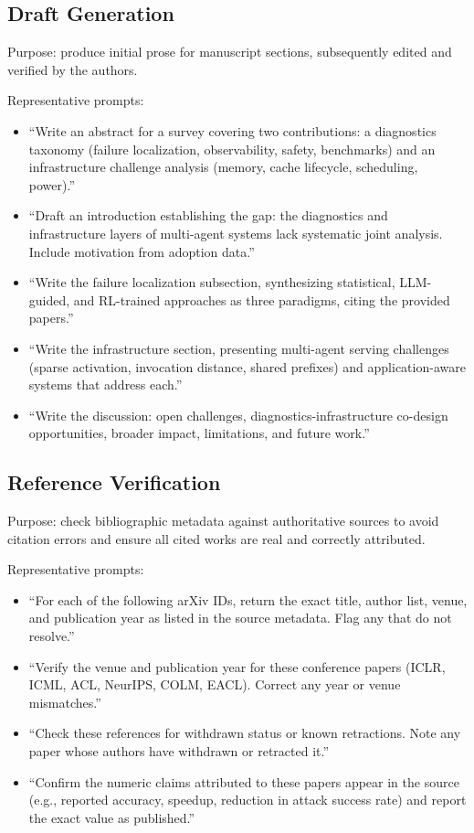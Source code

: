 \documentclass[utf8]{frontiers_suppmat}
\begin{document}
\subsection{Draft Generation}

Purpose: produce initial prose for manuscript sections, subsequently edited and verified by the authors.

Representative prompts:
\begin{itemize}
  \item ``Write an abstract for a survey covering two contributions: a
        diagnostics taxonomy (failure localization, observability, safety,
        benchmarks) and an infrastructure challenge analysis (memory,
        cache lifecycle, scheduling, power).''
  \item ``Draft an introduction establishing the gap: the diagnostics and
        infrastructure layers of multi-agent systems lack systematic joint
        analysis. Include motivation from adoption data.''
  \item ``Write the failure localization subsection, synthesizing
        statistical, LLM-guided, and RL-trained approaches as three
        paradigms, citing the provided papers.''
  \item ``Write the infrastructure section, presenting multi-agent serving
        challenges (sparse activation, invocation distance, shared
        prefixes) and application-aware systems that address each.''
  \item ``Write the discussion: open challenges, diagnostics-infrastructure
        co-design opportunities, broader impact, limitations, and future
        work.''
\end{itemize}

\subsection{Reference Verification}

Purpose: check bibliographic metadata against authoritative sources to avoid citation errors and ensure all cited works are real and correctly attributed.

Representative prompts:
\begin{itemize}
  \item ``For each of the following arXiv IDs, return the exact title,
        author list, venue, and publication year as listed in the source
        metadata. Flag any that do not resolve.''
  \item ``Verify the venue and publication year for these conference papers
        (ICLR, ICML, ACL, NeurIPS, COLM, EACL). Correct any year or venue
        mismatches.''
  \item ``Check these references for withdrawn status or known retractions.
        Note any paper whose authors have withdrawn or retracted it.''
  \item ``Confirm the numeric claims attributed to these papers appear in
        the source (e.g., reported accuracy, speedup, reduction in attack
        success rate) and report the exact value as published.''
\end{itemize}
\end{document}
